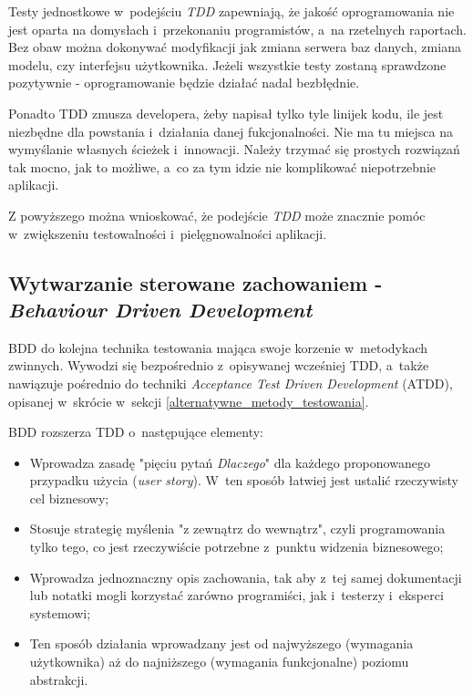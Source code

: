 Testy jednostkowe w~podejściu \textit{TDD} zapewniają, że jakość oprogramowania nie jest oparta na domysłach i~przekonaniu programistów, a~na rzetelnych raportach. Bez obaw można dokonywać modyfikacji jak zmiana serwera baz danych, zmiana modelu, czy interfejsu użytkownika. Jeżeli wszystkie testy zostaną sprawdzone pozytywnie - oprogramowanie będzie działać nadal bezbłędnie.

Ponadto TDD zmusza developera, żeby napisał tylko tyle linijek kodu, ile jest niezbędne dla powstania i~działania danej fukcjonalności. Nie ma tu miejsca na wymyślanie własnych ścieżek i~innowacji. Należy trzymać się prostych rozwiązań tak mocno, jak to możliwe, a~co za tym idzie nie komplikować niepotrzebnie aplikacji.

Z powyższego można wnioskować, że podejście \textit{TDD} może znacznie pomóc w~zwiększeniu testowalności i~pielęgnowalności aplikacji. 

\subsection{Wytwarzanie sterowane zachowaniem - \textit{Behaviour Driven Development}}
\label{behaviour_driven_development}
BDD do kolejna technika testowania mająca swoje korzenie w~metodykach zwinnych. Wywodzi się bezpośrednio z~opisywanej wcześniej TDD, a~także  nawiązuje pośrednio do techniki \textit{Acceptance Test Driven Development} (ATDD), opisanej w~skrócie w~sekcji \ref{alternatywne_metody_testowania}.

BDD rozszerza TDD o~następujące elementy:
\begin{itemize}
\item
Wprowadza zasadę "pięciu pytań \textit{Dlaczego}" dla każdego proponowanego przypadku użycia (\textit{user story}). W~ten sposób łatwiej jest ustalić rzeczywisty cel biznesowy;

\item
Stosuje strategię myślenia "z zewnątrz do wewnątrz", czyli programowania tylko tego, co jest rzeczywiście potrzebne z~punktu widzenia biznesowego;

\item
Wprowadza jednoznaczny opis zachowania, tak aby z~tej samej dokumentacji lub notatki mogli korzystać zarówno programiści, jak i~testerzy i~eksperci systemowi;

\item
Ten sposób działania wprowadzany jest od najwyższego (wymagania użytkownika) aż do najniższego (wymagania funkcjonalne) poziomu abstrakcji.

\end{itemize}

